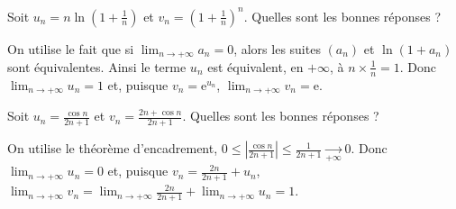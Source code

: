 \begin{question}
Soit $\displaystyle u_n=n\ln\left(1+\frac{1}{n}\right)$ et $\displaystyle v_n=\left(1+\frac{1}{n}\right)   ^n$. Quelles sont les bonnes réponses ?
\begin{answers}  
\end{answers}
\begin{explanations}
On utilise le fait que si $\displaystyle \lim _{n\to +\infty}a_n=0$, alors les suites $(a_n)$ et $\ln (1+a_n)$ sont équivalentes. Ainsi le terme $u_n$ est équivalent, en $+\infty$, à $\displaystyle n\times \frac{1}{n}=1$. Donc $\displaystyle \lim _{n\to +\infty}u_n=1$ et, puisque $v_n=\mathrm{e}^{u_n}$, $\displaystyle \lim _{n\to +\infty}v_n=\mathrm{e}$.
\end{explanations}
\end{question}



\begin{question}
Soit $\displaystyle u_n=\frac{\cos n}{2n+1}$ et $\displaystyle v_n=\frac{2n+\cos n}{2n+1}$. Quelles sont les bonnes réponses ?
\begin{answers}  
\end{answers}
\begin{explanations}
On utilise le théorème d'encadrement, $\displaystyle 0\leq \left|\frac{\cos n}{2n+1}\right|\leq \frac{1}{2n+1}\underset{+\infty}{\longrightarrow }0$. Donc $\displaystyle \lim _{n\to +\infty}u_n=0$ et, puisque $\displaystyle v_n=\frac{2n}{2n+1}+u_n$, $\displaystyle \lim _{n\to +\infty}v_n=\lim _{n\to +\infty}\frac{2n}{2n+1}+\lim _{n\to +\infty}u_n=1$.
\end{explanations}
\end{question}



